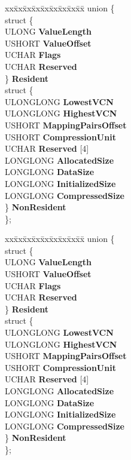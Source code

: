 \begin{DoxyCompactItemize}
\begin{tabbing}
xx\=xx\=xx\=xx\=xx\=xx\=xx\=xx\=xx\=\kill
union \{\\
\>struct \{\\
\>\>ULONG {\bfseries ValueLength}\\
\>\>USHORT {\bfseries ValueOffset}\\
\>\>UCHAR {\bfseries Flags}\\
\>\>UCHAR {\bfseries Reserved}\\
\>\} {\bfseries Resident}\\
\>struct \{\\
\>\>ULONGLONG {\bfseries LowestVCN}\\
\>\>ULONGLONG {\bfseries HighestVCN}\\
\>\>USHORT {\bfseries MappingPairsOffset}\\
\>\>USHORT {\bfseries CompressionUnit}\\
\>\>UCHAR {\bfseries Reserved} \mbox{[}4\mbox{]}\\
\>\>LONGLONG {\bfseries AllocatedSize}\\
\>\>LONGLONG {\bfseries DataSize}\\
\>\>LONGLONG {\bfseries InitializedSize}\\
\>\>LONGLONG {\bfseries CompressedSize}\\
\>\} {\bfseries NonResident}\\
\}; \\

\end{tabbing}\item 
\mbox{\label{struct_n_t_f_s___a_t_t_r___r_e_c_o_r_d_abdbb64e891730d1dc564a104d06b7661}} 
\begin{tabbing}
xx\=xx\=xx\=xx\=xx\=xx\=xx\=xx\=xx\=\kill
union \{\\
\>struct \{\\
\>\>ULONG {\bfseries ValueLength}\\
\>\>USHORT {\bfseries ValueOffset}\\
\>\>UCHAR {\bfseries Flags}\\
\>\>UCHAR {\bfseries Reserved}\\
\>\} {\bfseries Resident}\\
\>struct \{\\
\>\>ULONGLONG {\bfseries LowestVCN}\\
\>\>ULONGLONG {\bfseries HighestVCN}\\
\>\>USHORT {\bfseries MappingPairsOffset}\\
\>\>USHORT {\bfseries CompressionUnit}\\
\>\>UCHAR {\bfseries Reserved} \mbox{[}4\mbox{]}\\
\>\>LONGLONG {\bfseries AllocatedSize}\\
\>\>LONGLONG {\bfseries DataSize}\\
\>\>LONGLONG {\bfseries InitializedSize}\\
\>\>LONGLONG {\bfseries CompressedSize}\\
\>\} {\bfseries NonResident}\\
\}; \\


\end{tabbing}
\end{DoxyCompactItemize}

